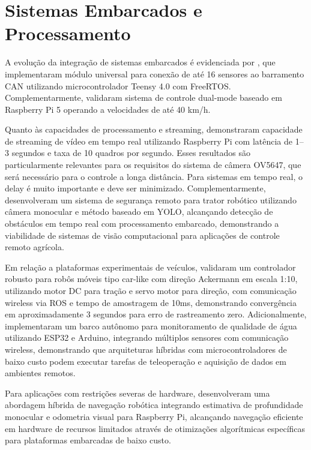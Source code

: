 \section{Sistemas Embarcados e Processamento}
\label{sec:sistemas-embarcados}

A evolução da integração de sistemas embarcados é evidenciada por , que implementaram módulo universal para conexão de até 16 sensores ao barramento CAN utilizando microcontrolador Teensy 4.0 com FreeRTOS. Complementarmente,  validaram sistema de controle dual-mode baseado em Raspberry Pi 5 operando a velocidades de até 40 km/h\@.

Quanto às capacidades de processamento e streaming,  demonstraram capacidade de streaming de vídeo em tempo real utilizando Raspberry Pi com latência de 1--3 segundos e taxa de 10 quadros por segundo. Esses resultados são particularmente relevantes para os requisitos do sistema de câmera OV5647, que será necessário para o controle a longa distância. Para sistemas em tempo real, o delay é muito importante e deve ser minimizado. Complementarmente,  desenvolveram um sistema de segurança remoto para trator robótico utilizando câmera monocular e método baseado em YOLO, alcançando detecção de obstáculos em tempo real com processamento embarcado, demonstrando a viabilidade de sistemas de visão computacional para aplicações de controle remoto agrícola.

Em relação a plataformas experimentais de veículos,  validaram um controlador robusto para robôs móveis tipo car-like com direção Ackermann em escala 1:10, utilizando motor DC para tração e servo motor para direção, com comunicação wireless via ROS e tempo de amostragem de 10ms, demonstrando convergência em aproximadamente 3 segundos para erro de rastreamento zero. Adicionalmente,  implementaram um barco autônomo para monitoramento de qualidade de água utilizando ESP32 e Arduino, integrando múltiplos sensores com comunicação wireless, demonstrando que arquiteturas híbridas com microcontroladores de baixo custo podem executar tarefas de teleoperação e aquisição de dados em ambientes remotos.

Para aplicações com restrições severas de hardware,  desenvolveram uma abordagem híbrida de navegação robótica integrando estimativa de profundidade monocular e odometria visual para Raspberry Pi, alcançando navegação eficiente em hardware de recursos limitados através de otimizações algorítmicas específicas para plataformas embarcadas de baixo custo.

